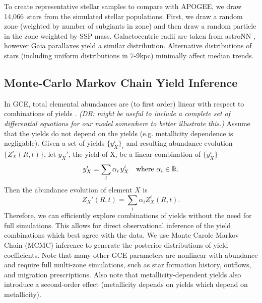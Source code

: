 \documentclass[fleqn,
usenatbib]{mnras}
\newcommand{\nsubgiants}{14,066}
\newcommand{\dbnote}[1]{ {\color{Thistle} \textit{\small (DB: #1)}} }
\begin{document}
To create representative stellar samples to compare with APOGEE, 
we draw \nsubgiants\ stars from the simulated stellar populations. First, we draw a random zone (weighted by number of subgiants in zone) and then draw a random particle in the zone weighted by SSP mass.
Galactocentric radii are taken from astroNN \citep{leung+bovy19, leung+bovy19b}, however Gaia parallaxes yield a similar distribution. Alternative distributions of stars (including uniform distributions in 7-9kpc) minimally affect median trends.

\subsection{Monte-Carlo Markov Chain Yield Inference} \label{sec:mcmc_methods}

In GCE, total elemental abundances are (to first order) linear with respect to combinations of yields \citep[e.g.][]{WAF17}.
\dbnote{might be useful to include a complete set of differential equations for our model somewhere to better illustrate this.}
Assume that the yields do not depend on the yields (e.g. metallicity dependence is negligable). 
Given a set of yields $\{y_X^i\}_i$ and resulting abundance evolution $\{Z_{X}^i(R, t) \}$, let $y_X'$, the yield of X, be a linear combination of $\{y_X^i\}$
\begin{equation}
    y_X' = \sum_i \alpha_i\, y_X^i \quad {\rm where\ } \alpha_i \in \mathbb{R}.
\end{equation}
Then the abundance evolution of element $X$ is
\begin{equation}\label{eq:lin_combo}
    Z_X'(R, t) = \sum_i \alpha_i Z_X^i(R, t).
\end{equation}
Therefore, we can efficiently explore combinations of yields without the need for full simulations. This allows for direct observational inference of the yield combinations which best agree with the data.
We use Monte Carole Markov Chain (MCMC) inference to generate the posterior distributions of yield coefficients. Note that many other GCE parameters are nonlinear with abundance and require full multi-zone simulations, such as star formation history, outflows, and migration prescriptions. 
Also note that metallicity-dependent yields also introduce a second-order effect (metallicity depends on yields which depend on metallicity).
\end{document}
